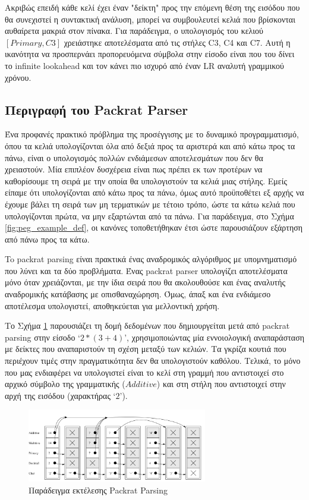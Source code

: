 \documentclass[diploma]{softlab-thesis}
\begin{document}
Ακριβώς επειδή κάθε κελί έχει έναν "δείκτη" προς την επόμενη θέση της εισόδου που θα συνεχιστεί η συντακτική ανάλυση, μπορεί να συμβουλευτεί κελιά που βρίσκονται αυθαίρετα μακριά στον πίνακα.
Για παράδειγμα, ο υπολογισμός του κελιού $[Primary, C3]$ χρειάστηκε αποτελέσματα από τις στήλες C3, C4 και C7. 
Αυτή η ικανότητα να προσπερνάει προπορευόμενα σύμβολα στην είσοδο είναι που του δίνει το infinite lookahead και τον κάνει πιο ισχυρό από έναν LR αναλυτή γραμμικού χρόνου.

\subsection{Περιγραφή του Packrat Parser}

Ένα προφανές πρακτικό πρόβλημα της προσέγγισης με το δυναμικό προγραμματισμό, όπου τα κελιά υπολογίζονται όλα από δεξιά προς τα αριστερά και από κάτω προς τα πάνω, είναι ο υπολογισμός πολλών ενδιάμεσων αποτελεσμάτων που δεν θα χρειαστούν. 
Μία επιπλέον δυσχέρεια είναι πως πρέπει εκ των προτέρων να καθορίσουμε τη σειρά με την οποία θα υπολογιστούν τα κελιά μιας στήλης.
Εμείς είπαμε ότι υπολογίζονται από κάτω προς τα πάνω, όμως αυτό προϋποθέτει εξ αρχής να έχουμε βάλει τη σειρά των μη τερματικών με τέτοιο τρόπο, ώστε τα κάτω κελιά που υπολογίζονται πρώτα, να μην εξαρτώνται από τα πάνω.
Για παράδειγμα, στο Σχήμα \ref{fig:peg_example_def}, οι κανόνες τοποθετήθηκαν έτσι ώστε παρουσιάζουν εξάρτηση από πάνω προς τα κάτω.

To packrat parsing είναι πρακτικά ένας αναδρομικός αλγόριθμος με υπομνηματισμό που λύνει και τα δύο προβλήματα.
Ένας packrat parser υπολογίζει αποτελέσματα μόνο όταν χρειάζονται, με την ίδια σειρά που θα ακολουθούσε και ένας αναλυτής αναδρομικής κατάβασης με οπισθαναχώρηση.
Όμως, άπαξ και ένα ενδιάμεσο αποτέλεσμα υπολογιστεί, αποθηκεύεται για μελλοντική χρήση.

Το Σχήμα \ref{fig:packrat_memo_example} παρουσιάζει τη δομή δεδομένων που δημιουργείται μετά από packrat parsing στην είσοδο `$2 * (3 + 4)$', χρησιμοποιώντας μία εννοιολογική αναπαράσταση με δείκτες που αναπαριστούν τη σχέση μεταξύ των κελιών.
Τα γκρίζα κουτιά που περιέχουν τιμές στην πραγματικότητα δεν θα υπολογιστούν καθόλου.
Τελικά, το μόνο που μας ενδιαφέρει να υπολογιστεί είναι το κελί στη γραμμή που αντιστοιχεί στο αρχικό σύμβολο της γραμματικής ($Additive$) και στη στήλη που αντιστοιχεί στην αρχή της εισόδου (χαρακτήρας `$2$').

\begin{figure}[h]
    \centering
	\includegraphics[width=0.70\textwidth]{pics/packrat_memo_example}
	\caption{Παράδειγμα εκτέλεσης Packrat Parsing}
    \label{fig:packrat_memo_example}
\end{figure}
\end{document}
